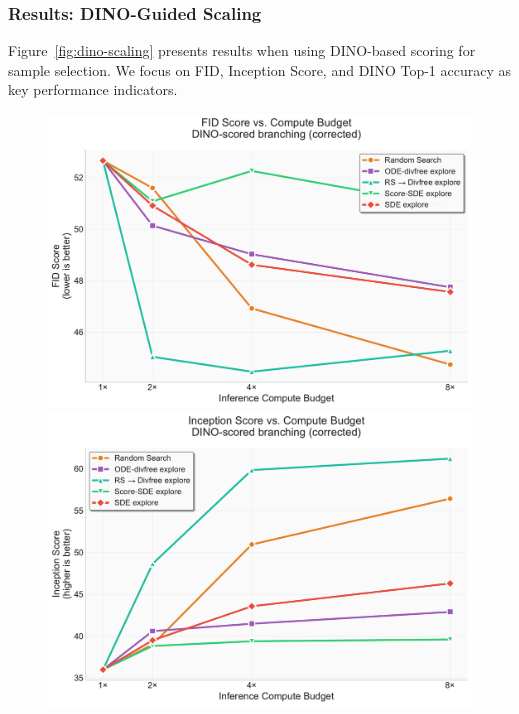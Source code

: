 \documentclass{article}
\begin{document}
\subsubsection{Results: DINO-Guided Scaling}

Figure~\ref{fig:dino-scaling} presents results when using DINO-based scoring for sample selection. We focus on FID, Inception Score, and DINO Top-1 accuracy as key performance indicators.

\begin{figure}[H]
  \centering
  \begin{minipage}{0.32\textwidth}
    \centering
    \includegraphics[width=\textwidth]{figures/scaling_dino_fid.pdf}
  \end{minipage}
  \hfill
  \begin{minipage}{0.32\textwidth}
    \centering
    \includegraphics[width=\textwidth]{figures/scaling_dino_is.pdf}

\end{minipage}
\end{figure}
\end{document}
